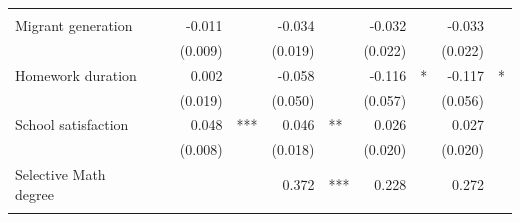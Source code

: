 \documentclass{article}
\begin{document}
\begin{table}[!h]
\begin{tabular}{lllllllllll}
  \multicolumn{1}{l}{} \\
\multicolumn{1}{l}{Migrant generation} &
  \multicolumn{1}{r}{} &
  \multicolumn{1}{l}{} &
  \multicolumn{1}{r}{-0.011} &
  \multicolumn{1}{l}{} &
  \multicolumn{1}{r}{-0.034} &
  \multicolumn{1}{l}{} &
  \multicolumn{1}{r}{-0.032} &
  \multicolumn{1}{l}{} &
  \multicolumn{1}{r}{-0.033} &
  \multicolumn{1}{l}{} \\
\multicolumn{1}{l}{} &
  \multicolumn{1}{r}{} &
  \multicolumn{1}{l}{} &
  \multicolumn{1}{r}{(0.009)} &
  \multicolumn{1}{l}{} &
  \multicolumn{1}{r}{(0.019)} &
  \multicolumn{1}{l}{} &
  \multicolumn{1}{r}{(0.022)} &
  \multicolumn{1}{l}{} &
  \multicolumn{1}{r}{(0.022)} &
  \multicolumn{1}{l}{} \\
\multicolumn{1}{l}{Homework duration} &
  \multicolumn{1}{r}{} &
  \multicolumn{1}{l}{} &
  \multicolumn{1}{r}{0.002} &
  \multicolumn{1}{l}{} &
  \multicolumn{1}{r}{-0.058} &
  \multicolumn{1}{l}{} &
  \multicolumn{1}{r}{-0.116} &
  \multicolumn{1}{l}{*} &
  \multicolumn{1}{r}{-0.117} &
  \multicolumn{1}{l}{*} \\
\multicolumn{1}{l}{} &
  \multicolumn{1}{r}{} &
  \multicolumn{1}{l}{} &
  \multicolumn{1}{r}{(0.019)} &
  \multicolumn{1}{l}{} &
  \multicolumn{1}{r}{(0.050)} &
  \multicolumn{1}{l}{} &
  \multicolumn{1}{r}{(0.057)} &
  \multicolumn{1}{l}{} &
  \multicolumn{1}{r}{(0.056)} &
  \multicolumn{1}{l}{} \\
\multicolumn{1}{l}{School satisfaction} &
  \multicolumn{1}{r}{} &
  \multicolumn{1}{l}{} &
  \multicolumn{1}{r}{0.048} &
  \multicolumn{1}{l}{***} &
  \multicolumn{1}{r}{0.046} &
  \multicolumn{1}{l}{**} &
  \multicolumn{1}{r}{0.026} &
  \multicolumn{1}{l}{} &
  \multicolumn{1}{r}{0.027} &
  \multicolumn{1}{l}{} \\
\multicolumn{1}{l}{} &
  \multicolumn{1}{r}{} &
  \multicolumn{1}{l}{} &
  \multicolumn{1}{r}{(0.008)} &
  \multicolumn{1}{l}{} &
  \multicolumn{1}{r}{(0.018)} &
  \multicolumn{1}{l}{} &
  \multicolumn{1}{r}{(0.020)} &
  \multicolumn{1}{l}{} &
  \multicolumn{1}{r}{(0.020)} &
  \multicolumn{1}{l}{} \\
\multicolumn{1}{l}{Selective Math degree} &
  \multicolumn{1}{r}{} &
  \multicolumn{1}{l}{} &
  \multicolumn{1}{r}{} &
  \multicolumn{1}{l}{} &
  \multicolumn{1}{r}{0.372} &
  \multicolumn{1}{l}{***} &
  \multicolumn{1}{r}{0.228} &
  \multicolumn{1}{l}{} &
  \multicolumn{1}{r}{0.272} &
  \multicolumn{1}{l}{} \\
\multicolumn{1}{l}{} &
  \multicolumn{1}{r}{} &
  \multicolumn{1}{l}{} &
  \multicolumn{1}{r}{} &

\end{tabular}
\end{table}
\end{document}
